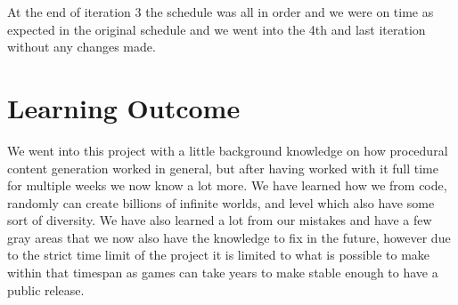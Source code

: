 At the end of iteration 3 the schedule was all in order and we were on time as expected in the original schedule and we went into the 4th and last iteration without any changes made.


\section{Learning Outcome}

We went into this project with a little background knowledge on how procedural content generation worked in general, but after having worked with it full time for multiple weeks we now know a lot more. We have learned how we from code, randomly can create billions of infinite worlds, and level which also have some sort of diversity. We have also learned a lot from our mistakes and have a few gray areas that we now also have the knowledge to fix in the future, however due to the strict time limit of the project it is limited to what is possible to make within that timespan as games can take years to make stable enough to have a public release.